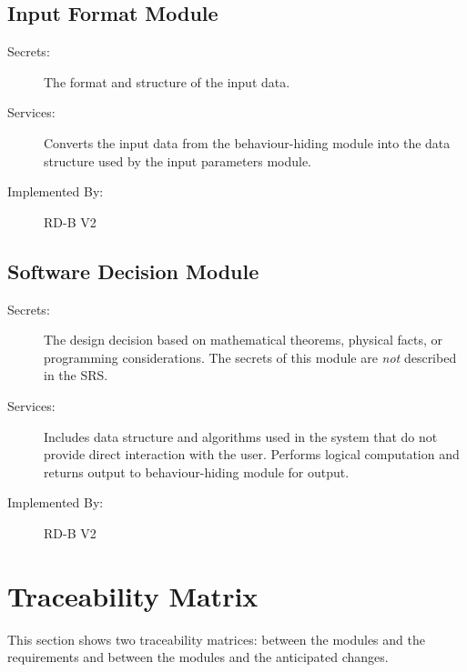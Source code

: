 \documentclass[12pt, titlepage]{article}
\begin{document}
\subsection{Input Format Module}

\begin{description}
\item[Secrets:]The format and structure of the input data.
\item[Services:]Converts the input data from the behaviour-hiding module into the data structure used by the
  input parameters module.
\item[Implemented By:] RD-B V2
\end{description}

\subsection{Software Decision Module}

\begin{description}
\item[Secrets:] The design decision based on mathematical theorems, physical
  facts, or programming considerations. The secrets of this module are
  \emph{not} described in the SRS.
\item[Services:] Includes data structure and algorithms used in the system that
  do not provide direct interaction with the user. Performs logical computation and returns output to behaviour-hiding module for output. 
\item[Implemented By:] RD-B V2
\end{description}


\section{Traceability Matrix} \label{SecTM}

This section shows two traceability matrices: between the modules and the
requirements and between the modules and the anticipated changes.
\end{document}
